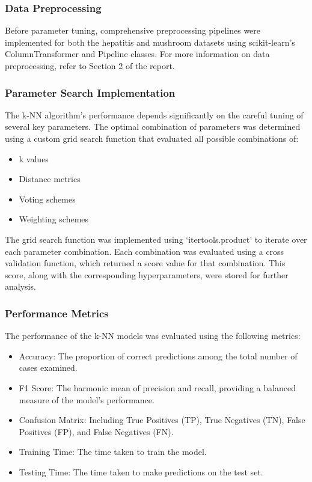 \subsubsection*{Data Preprocessing}
Before parameter tuning, comprehensive preprocessing pipelines were implemented for both the hepatitis
and mushroom datasets using scikit-learn's ColumnTransformer and Pipeline classes.
For more information on data preprocessing, refer to Section 2 of the report.

\subsubsection*{Parameter Search Implementation}
The k-NN algorithm's performance depends significantly on the careful tuning of several key parameters.
The optimal combination of parameters was determined using a custom grid search function that evaluated all possible combinations of:
\begin{itemize}
    \item k values
    \item Distance metrics
    \item Voting schemes
    \item Weighting schemes
\end{itemize}

The grid search function was implemented using `itertools.product' to iterate over each parameter combination.
Each combination was evaluated using a cross validation function, which returned a score value for that combination.
This score, along with the corresponding hyperparameters, were stored for further analysis.

\subsubsection*{Performance Metrics}

The performance of the k-NN models was evaluated using the following metrics:

\begin{itemize}
    \item Accuracy: The proportion of correct predictions among the total number of cases examined.
    \item F1 Score: The harmonic mean of precision and recall, providing a balanced measure of the model's performance.
    \item Confusion Matrix: Including True Positives (TP), True Negatives (TN), False Positives (FP), and False Negatives (FN).
    \item Training Time: The time taken to train the model.
    \item Testing Time: The time taken to make predictions on the test set.
\end{itemize}

